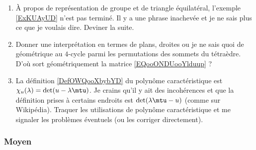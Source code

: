 \begin{enumerate}
    \item
        À propos de représentation de groupe et de triangle équilatéral, l'exemple \ref{ExKUAyUD} n'est pas terminé. Il y a une phrase inachevée et je ne sais plus ce que je voulais dire. Deviner la suite.
    \item
        Donner une interprétation en termes de plans, droites ou je ne sais quoi de géométrique au \( 4\)-cycle parmi les permutations des sommets du tétraèdre. D'où sort géométriquement la matrice \eqref{EQooONDUooYlduup} ?
    \item 
        La définition \ref{DefOWQooXbybYD} du polynôme caractéristique est \( \chi_u(\lambda)=\det(u-\lambda \mtu)\). Je crains qu'il y ait des incohérences et que la définition prises à certains endroits est \( \det(\lambda\mtu-u)\) (comme sur Wikipédia). Traquer les utilisations de polynôme caractéristique et me signaler les problèmes éventuels (ou les corriger directement).
\end{enumerate}

\subsubsection{Moyen}


